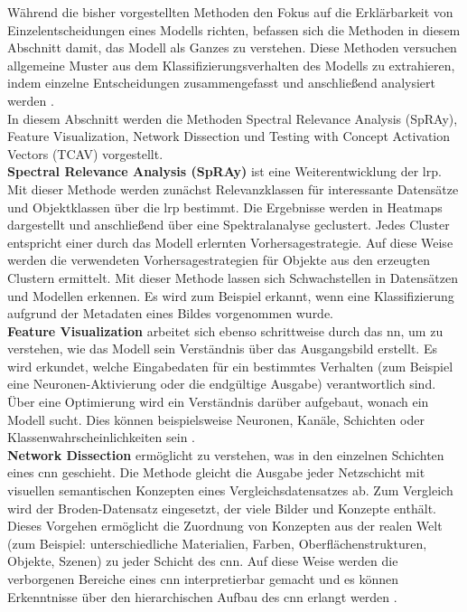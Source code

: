 \documentclass[twoside, 12pt,a4paper]{book}
\numberwithin{equation}{section}
\begin{document}
	Während die bisher vorgestellten Methoden den Fokus auf die Erklärbarkeit von Einzelentscheidungen eines Modells richten, befassen sich die Methoden in diesem
	Abschnitt damit, das Modell als Ganzes zu verstehen. Diese Methoden versuchen allgemeine
	Muster aus dem Klassifizierungsverhalten des Modells zu extrahieren, indem einzelne Entscheidungen zusammengefasst und anschließend analysiert werden \cite{samek2019towards}.\\
	In diesem Abschnitt werden die Methoden Spectral Relevance Analysis (SpRAy),
	Feature Visualization, Network Dissection und Testing with Concept Activation Vectors (TCAV) vorgestellt.\\
	
	\noindent \textbf{Spectral Relevance Analysis (SpRAy)} ist eine Weiterentwicklung der \ac{lrp}. Mit
	dieser Methode werden zunächst Relevanzklassen für interessante Datensätze und
	Objektklassen über die \ac{lrp} bestimmt. Die Ergebnisse werden in Heatmaps dargestellt
	und anschließend über eine Spektralanalyse geclustert. Jedes Cluster entspricht einer
	durch das Modell erlernten Vorhersagestrategie. Auf diese Weise werden die verwendeten Vorhersagestrategien für Objekte aus den erzeugten Clustern ermittelt\cite{unmaskingCH}. Mit dieser Methode lassen sich Schwachstellen in Datensätzen und Modellen erkennen. Es wird zum Beispiel erkannt, wenn eine Klassifizierung aufgrund der Metadaten eines Bildes vorgenommen wurde.\\
	
	
	\noindent \textbf{Feature Visualization} arbeitet sich ebenso schrittweise durch das \ac{nn},
	um zu verstehen, wie das Modell sein Verständnis über das Ausgangsbild erstellt.
	Es wird erkundet, welche Eingabedaten für ein bestimmtes Verhalten (zum Beispiel eine Neuronen-Aktivierung oder die endgültige Ausgabe) verantwortlich sind. Über eine Optimierung wird ein Verständnis darüber aufgebaut, wonach ein Modell sucht. Dies können beispielsweise Neuronen, Kanäle, Schichten oder
	Klassenwahrscheinlichkeiten sein \cite{feature_vis}.\\
	
	
	\noindent \textbf{Network Dissection} ermöglicht zu verstehen, was in den einzelnen Schichten eines \ac{cnn} geschieht. Die Methode gleicht die Ausgabe jeder Netzschicht mit visuellen semantischen Konzepten eines Vergleichsdatensatzes ab. Zum Vergleich wird der Broden-Datensatz eingesetzt, der viele Bilder und Konzepte enthält. Dieses Vorgehen ermöglicht die Zuordnung von Konzepten aus der realen Welt (zum Beispiel: unterschiedliche Materialien, Farben,
	Oberflächenstrukturen, Objekte, Szenen) zu jeder Schicht des \ac{cnn}. Auf diese Weise
	werden die verborgenen Bereiche eines \ac{cnn} interpretierbar gemacht und es
	können Erkenntnisse über den hierarchischen Aufbau des \ac{cnn} erlangt werden \cite{networkdis}.\\
	
\end{document}

